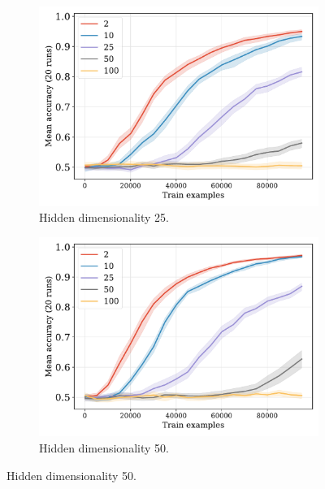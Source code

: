 \documentclass[12pt]{article}
\begin{document}
\begin{figure}[H]
  \begin{subfigure}{0.45\linewidth}
    \includegraphics[width=1\textwidth]{fig/flatpremack-h1-train_size-embed_dim-hidden_dim=25.pdf}
    \caption{Hidden dimensionality 25.}
  \end{subfigure}
  \hfill
  \begin{subfigure}{0.45\linewidth}
    \includegraphics[width=1\textwidth]{fig/flatpremack-h1-train_size-embed_dim-hidden_dim=50.pdf}
    \caption{Hidden dimensionality 50.}
  \end{subfigure}


\end{figure}
\end{document}
